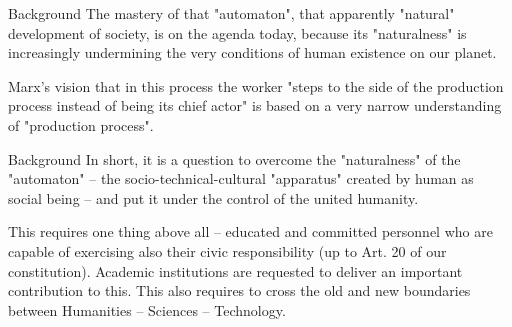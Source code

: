 \documentclass{beamer}
\begin{document}
\begin{frame}{Background}
The mastery of that "automaton", that apparently "natural" development of
society, is on the agenda today, because its "naturalness" is increasingly
undermining the very conditions of human existence on our planet.

Marx's vision that in this process the worker "steps to the side of the
production process instead of being its chief actor" is based on a very narrow
understanding of "production process".
\end{frame}


\begin{frame}{Background}
In short, it is a question to overcome the "naturalness" of the "automaton" --
the socio-technical-cultural "apparatus" created by human as social being  --
and put it under the control of the united humanity.

This requires one thing above all -- educated and committed personnel who are
capable of exercising also their civic responsibility (up to Art. 20 of our
constitution).  Academic institutions are requested to deliver an important
contribution to this.  This also requires to cross the old and new boundaries
between Humanities -- Sciences -- Technology.
\end{frame}
\end{document}
